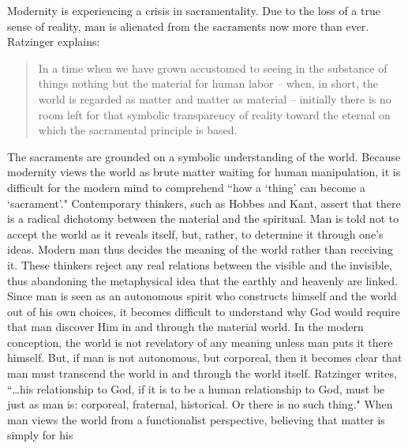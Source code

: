 \documentclass[twoside,10pt]{article}
\begin{document}
Modernity is experiencing a crisis in sacramentality. Due to the loss of a true sense of reality, man is alienated from the sacraments now more than ever. Ratzinger explains: 

\begin{quote}
	In a time when we have grown accustomed to seeing in the substance of things nothing but the material for human labor – when, in short, the world is regarded as matter and matter as material – initially there is no room left for that symbolic transparency of reality toward the eternal on which the sacramental principle is based.\autocite[153-4]{rat2}
\end{quote}

The sacraments are grounded on a symbolic understanding of the world. Because modernity views the world as brute matter waiting for human manipulation, it is difficult for the modern mind to comprehend ``how a ‘thing’ can become a ‘sacrament’."\autocite[154]{rat2} Contemporary thinkers, such as Hobbes and Kant, assert that there is a radical dichotomy between the material and the spiritual. Man is told not to accept the world as it reveals itself, but, rather, to determine it through one’s ideas. Modern man thus decides the meaning of the world rather than receiving it. These thinkers reject any real relations between the visible and the invisible, thus abandoning the metaphysical idea that the earthly and heavenly are linked.\autocite[7]{boersma} Since man is seen as an autonomous spirit who constructs himself and the world out of his own choices, it becomes difficult to understand why God would require that man discover Him in and through the material world.\autocite[154, If someone has a functionalist view of the cosmos, rather than a symbolic view, he is unable to see how matter can play a decisive role in man’s encounter with the divine. If matter is merely a brute fact, it cannot be revelatory of God or His actions. Thus, modern man questions if God is really working through the sacraments and fails to comprehend how sacramental actions can be decisive for his life. ``Is it not an unwarranted assumption to imagine that pouring a little water on a person should be existentially decisive for him? Or the imposition of hands by a bishop, which we call Confirmation? Or the anointing with a bit of consecrated oil that is given by the Church to a sick person to accompany him on the last stretch of his journey? And here and there even priests are starting to ask whether the laying on of hands by the bishop, which is called Holy Orders, really can signify an irrevocable commitment of a man’s life down to his final hour and whether in this case the significance of the rite has not been overrated…"]{rat2} In the modern conception, the world is not revelatory of any meaning unless man puts it there himself. But, if man is not autonomous, but corporeal, then it becomes clear that man must transcend the world in and through the world itself. Ratzinger writes, ``…his relationship to God, if it is to be a human relationship to God, must be just as man is: corporeal, fraternal, historical. Or there is no such thing."\autocite[166]{rat2} When man views the world from a functionalist perspective, believing that matter is simply for his 
\end{document}
